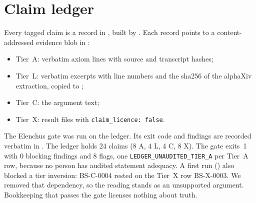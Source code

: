 \documentclass[11pt]{article}
\theoremstyle{remark}
\begin{document}
\section{Claim ledger}\label{sec:ledger}
Every tagged claim is a record in , built by . Each record points
to a content-addressed evidence blob in :
\begin{itemize}
\item Tier~A: verbatim axiom lines with source and transcript hashes;
\item Tier~L: verbatim excerpts with line numbers and the sha256 of the alphaXiv extraction, copied to
;
\item Tier~C: the argument text;
\item Tier~X: result files with \texttt{claim\_licence: false}.
\end{itemize}
The Elenchus gate  was run on the ledger. Its exit code and
findings are recorded verbatim in . The ledger holds 24 claims (8 A, 4 L, 4 C, 8 X).
The gate exits~1 with 0 blocking findings and 8 flags, one \texttt{LEDGER\_UNAUDITED\_TIER\_A} per Tier~A row, because
no person has audited statement adequacy. A first run () also blocked a tier
inversion: BS-C-0004 rested on the Tier~X row BS-X-0003. We removed that dependency, so the reading stands as an
unsupported argument. Bookkeeping that passes the gate licenses nothing about truth.
\end{document}
